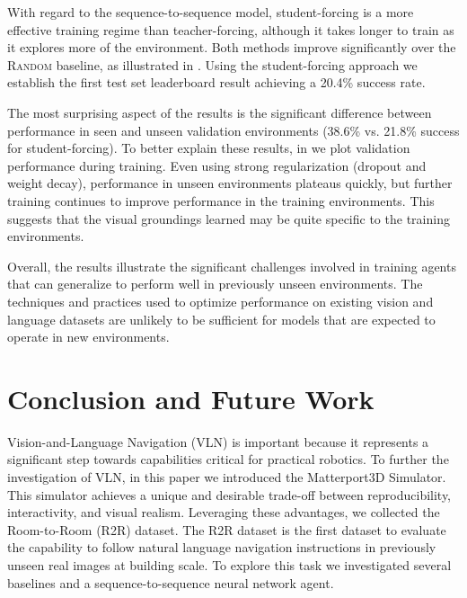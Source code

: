 \documentclass[10pt,twocolumn,letterpaper]{article}
\begin{document}
With regard to the sequence-to-sequence model, student-forcing is a more effective training regime than teacher-forcing, although it takes longer to train as it explores more of the environment. Both methods improve significantly over the \textsc{Random} baseline, as illustrated in . Using the student-forcing approach we establish the first test set leaderboard result achieving a 20.4\% success rate.

The most surprising aspect of the results is the significant difference between performance in seen and unseen validation environments (38.6\% vs. 21.8\% success for student-forcing). To better explain these results, in  we plot validation performance during training. Even using strong regularization (dropout and weight decay), performance in unseen environments plateaus quickly, but further training continues to improve performance in the training environments. This suggests that the visual groundings learned may be quite specific to the training environments. 

Overall, the results illustrate the significant challenges involved in training agents that can generalize to perform well in previously unseen environments. The techniques and practices used to optimize performance on existing vision and language datasets are unlikely to be sufficient for models that are expected to operate in new environments.





 
\section{Conclusion and Future Work}

Vision-and-Language Navigation (VLN) is important because it represents a significant step towards capabilities critical for practical robotics. To further the investigation of VLN, in this paper we introduced the Matterport3D Simulator. This simulator achieves a unique and desirable trade-off between reproducibility, interactivity, and visual realism. Leveraging these advantages, we collected the Room-to-Room (R2R) dataset. The R2R dataset is the first dataset to evaluate the capability to follow natural language navigation instructions in previously unseen real images at building scale. To explore this task we investigated several baselines and a sequence-to-sequence neural network agent.
\end{document}
